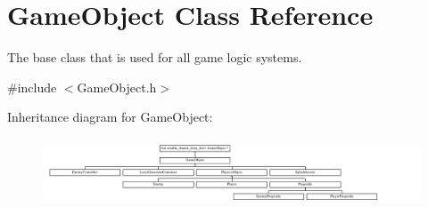 \hypertarget{class_game_object}{}\section{Game\+Object Class Reference}
\label{class_game_object}


The base class that is used for all game logic systems.  




{\ttfamily \#include $<$Game\+Object.\+h$>$}

Inheritance diagram for Game\+Object\+:\begin{figure}[H]
\begin{center}
\leavevmode
\includegraphics[height=2.021661cm]{d0/dd1/class_game_object}
\end{center}
\end{figure}
